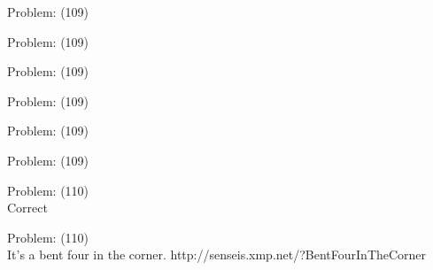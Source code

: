 \documentclass[11pt]{article}
\begin{document}
\begin{minipage}[t]{0.5\textwidth}
  {\centering
  
Problem: (109)\\
  }
\end{minipage}
\begin{minipage}[t]{0.5\textwidth}
  {\centering
  
Problem: (109)\\
  }
\end{minipage}
\begin{minipage}[t]{0.5\textwidth}
  {\centering
  
Problem: (109)\\
  }
\end{minipage}
\begin{minipage}[t]{0.5\textwidth}
  {\centering
  
Problem: (109)\\
  }
\end{minipage}
\begin{minipage}[t]{0.5\textwidth}
  {\centering
  
Problem: (109)\\
  }
\end{minipage}
\begin{minipage}[t]{0.5\textwidth}
  {\centering
  
Problem: (109)\\
  }
\end{minipage}
\begin{minipage}[t]{0.5\textwidth}
  {\centering
  
Problem: (110)\\
Correct\\
  }
\end{minipage}
\begin{minipage}[t]{0.5\textwidth}
  {\centering
  
Problem: (110)\\
It's a bent four in the corner. 
http://senseis.xmp.net/?BentFourInTheCorner\\
  }
\end{minipage}
\end{document}
